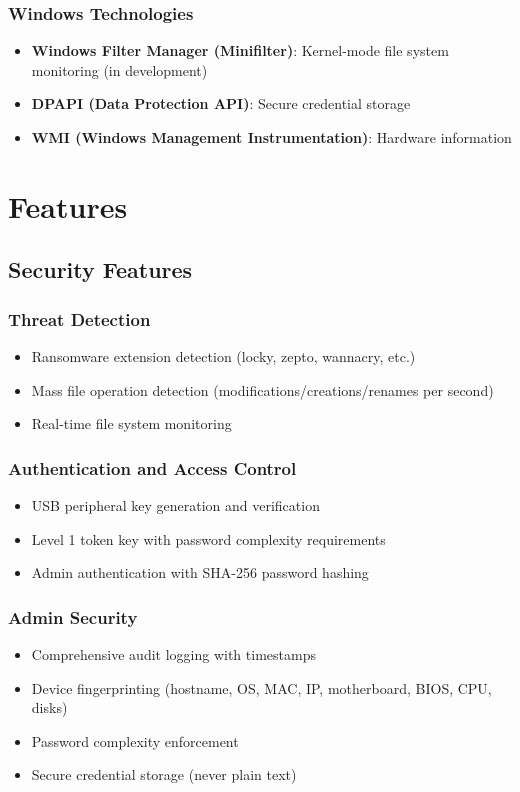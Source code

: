 \documentclass[12pt,letterpaper]{report}
\begin{document}
\subsection{Windows Technologies}
\begin{itemize}
    \item \textbf{Windows Filter Manager (Minifilter)}: Kernel-mode file system monitoring (in development)
    \item \textbf{DPAPI (Data Protection API)}: Secure credential storage
    \item \textbf{WMI (Windows Management Instrumentation)}: Hardware information
\end{itemize}

\chapter{Features}
\section{Security Features}
\subsection{Threat Detection}
\begin{itemize}
    \item Ransomware extension detection (locky, zepto, wannacry, etc.)
    \item Mass file operation detection (modifications/creations/renames per second)
    \item Real-time file system monitoring
\end{itemize}

\subsection{Authentication and Access Control}
\begin{itemize}
    \item USB peripheral key generation and verification
    \item Level 1 token key with password complexity requirements
    \item Admin authentication with SHA-256 password hashing
\end{itemize}

\subsection{Admin Security}
\begin{itemize}
    \item Comprehensive audit logging with timestamps
    \item Device fingerprinting (hostname, OS, MAC, IP, motherboard, BIOS, CPU, disks)
    \item Password complexity enforcement
    \item Secure credential storage (never plain text)
\end{itemize}
\end{document}
